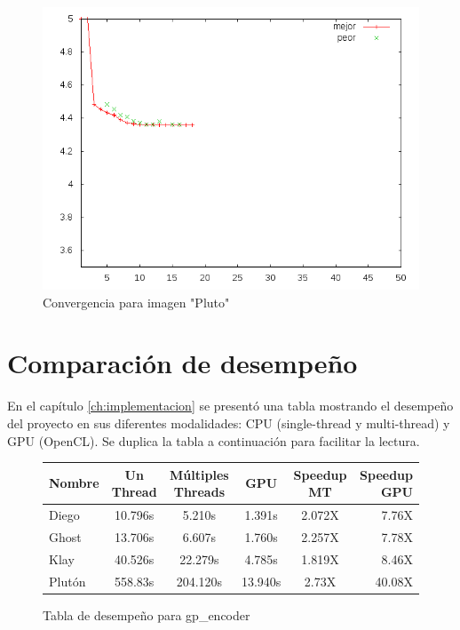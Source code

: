 \begin{figure}[h]\label{img:plot_pluto}
    \includegraphics[width=1.0\textwidth]{plot_pluto}
    \caption{Convergencia para imagen "Pluto"}
    \label{fig:huffman}
\end{figure}

\section{Comparación de desempeño}

En el capítulo \ref{ch:implementacion} se presentó una tabla mostrando el
desempeño del proyecto en sus diferentes modalidades: CPU (single-thread y
multi-thread) y GPU (OpenCL). Se duplica la tabla a continuación para facilitar
la lectura.

\begin{figure}[h] \label{fig:perf_table}
    \begin{tabular}{ |l c c c c r| }
        \hline
        Nombre &  Un Thread & Múltiples Threads & GPU & Speedup MT & Speedup GPU \\
        \hline
        Diego & 10.796s & 5.210s & 1.391s  & 2.072X & 7.76X \\
        Ghost & 13.706s & 6.607s & 1.760s  & 2.257X & 7.78X \\
        Klay & 40.526s & 22.279s & 4.785s  & 1.819X & 8.46X \\%
        Plutón & 558.83s & 204.120s & 13.940s & 2.73X & 40.08X \\ %
        \hline
    \end{tabular}
    \caption{Tabla de desempeño para gp\_encoder}
\end{figure}



